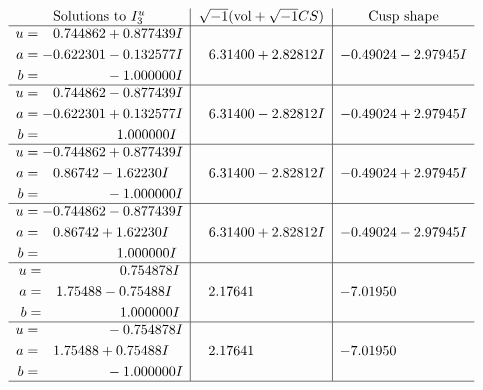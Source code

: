 \documentclass[1p]{elsarticle_modified}
\theoremstyle{definition}
\newcommand{\I}{\sqrt{-1}}
\begin{document}
$$\begin{array}{c|c|c}  
\text{Solutions to }I^u_{3}& \I (\text{vol} + \sqrt{-1}CS) & \text{Cusp shape}\\
 \hline 
\begin{aligned}
u &= \phantom{-}0.744862 + 0.877439 I \\
a &= -0.622301 - 0.132577 I \\
b &= \phantom{-0.000000 } -1.000000 I\end{aligned}
 & \phantom{-}6.31400 + 2.82812 I & -0.49024 - 2.97945 I \\ \hline\begin{aligned}
u &= \phantom{-}0.744862 - 0.877439 I \\
a &= -0.622301 + 0.132577 I \\
b &= \phantom{-0.000000 -}1.000000 I\end{aligned}
 & \phantom{-}6.31400 - 2.82812 I & -0.49024 + 2.97945 I \\ \hline\begin{aligned}
u &= -0.744862 + 0.877439 I \\
a &= \phantom{-}0.86742 - 1.62230 I \\
b &= \phantom{-0.000000 } -1.000000 I\end{aligned}
 & \phantom{-}6.31400 - 2.82812 I & -0.49024 + 2.97945 I \\ \hline\begin{aligned}
u &= -0.744862 - 0.877439 I \\
a &= \phantom{-}0.86742 + 1.62230 I \\
b &= \phantom{-0.000000 -}1.000000 I\end{aligned}
 & \phantom{-}6.31400 + 2.82812 I & -0.49024 - 2.97945 I \\ \hline\begin{aligned}
u &= \phantom{-0.000000 -}0.754878 I \\
a &= \phantom{-}1.75488 - 0.75488 I \\
b &= \phantom{-0.000000 -}1.000000 I\end{aligned}
 & \phantom{-}2.17641\phantom{ +0.000000I} & -7.01950\phantom{ +0.000000I} \\ \hline\begin{aligned}
u &= \phantom{-0.000000 } -0.754878 I \\
a &= \phantom{-}1.75488 + 0.75488 I \\
b &= \phantom{-0.000000 } -1.000000 I\end{aligned}
 & \phantom{-}2.17641\phantom{ +0.000000I} & -7.01950\phantom{ +0.000000I}\\
 \hline 
 \end{array}$$\newpage
\end{document}
